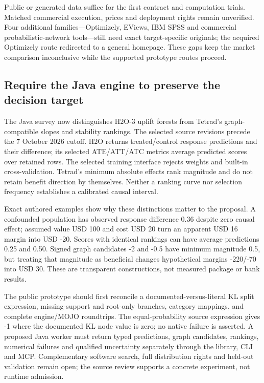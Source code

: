 Public or generated data suffice for the first contract and computation
trials. Matched commercial execution, prices and deployment rights
remain unverified. Four additional families---Optimizely, EViews, IBM
SPSS and commercial probabilistic-network tools---still need exact
target-specific originals; the acquired Optimizely route redirected to a
general homepage. These gaps keep the market comparison inconclusive
while the supported prototype routes proceed.

\hypertarget{require-the-java-engine-to-preserve-the-decision-target}{%
\subsection{Require the Java engine to preserve the decision
target}\label{require-the-java-engine-to-preserve-the-decision-target}}

The Java survey now distinguishes H2O-3 uplift forests from Tetrad's
graph-compatible slopes and stability rankings. The selected source
revisions precede the 7 October 2026 cutoff. H2O returns treated/control
response predictions and their difference; its selected ATE/ATT/ATC
metrics average predicted scores over retained rows. The selected
training interface rejects weights and built-in cross-validation.
Tetrad's minimum absolute effects rank magnitude and do not retain
benefit direction by themselves. Neither a ranking curve nor selection
frequency establishes a calibrated causal interval.
\citep{exec20_javaeffects_h2o,exec20_javaeffects_tetrad}

Exact authored examples show why these distinctions matter to the
proposal. A confounded population has observed response difference 0.36
despite zero causal effect; assumed value USD 100 and cost USD 20 turn
an apparent USD 16 margin into USD -20. Scores with identical rankings
can have average predictions 0.25 and 0.50. Signed graph candidates -2
and -0.5 have minimum magnitude 0.5, but treating that magnitude as
beneficial changes hypothetical margins -220/-70 into USD 30. These are
transparent constructions, not measured package or bank results.
\citep{exec20_javaeffects_reference}

The public prototype should first reconcile a documented-versus-literal
KL split expression, missing-support and root-only branches, category
mappings, and complete engine/MOJO roundtrips. The equal-probability
source expression gives -1 where the documented KL node value is zero;
no native failure is asserted. A proposed Java worker must return typed
predictions, graph candidates, rankings, numerical failures and
qualified uncertainty separately through the library, CLI and MCP.
Complementary software search, full distribution rights and held-out
validation remain open; the source review supports a concrete
experiment, not runtime admission.
\citep{exec20_javaeffects_h2o,exec20_javaeffects_tetrad,exec20_javaeffects_reference}

